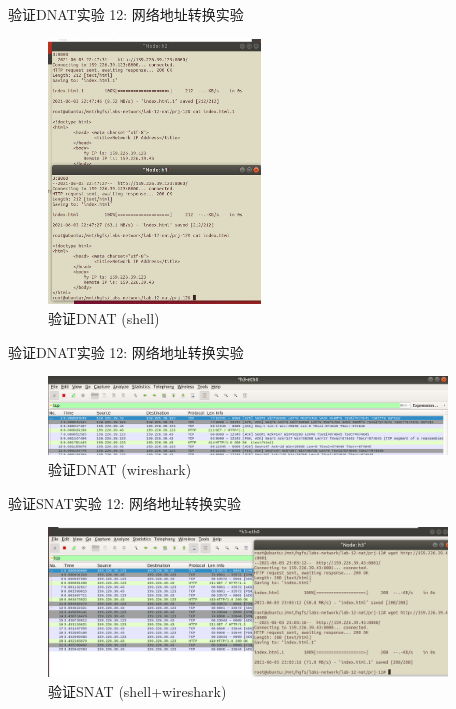 \documentclass{beamer}
\begin{document}
\begin{frame}{验证DNAT}{实验 12: 网络地址转换实验}
    \begin{figure}[h]
        \centering %
        \includegraphics[width=160pt]{
            ../lab-12-nat/readme.assets/p1-website.png}
        \caption{验证DNAT (shell)} %
    \end{figure}
\end{frame}
\begin{frame}{验证DNAT}{实验 12: 网络地址转换实验}
    \begin{figure}[h]
        \centering %
        \includegraphics[width=300pt]{
            ../lab-12-nat/readme.assets/p1-ws.png}
        \caption{验证DNAT (wireshark)} %
    \end{figure}
\end{frame}
\begin{frame}{验证SNAT}{实验 12: 网络地址转换实验}
    \begin{figure}[h]
        \centering %
        \includegraphics[width=300pt]{
            ../lab-12-nat/readme.assets/p2.png}
        \caption{验证SNAT (shell+wireshark)} %
    \end{figure}
\end{frame}
\end{document}
